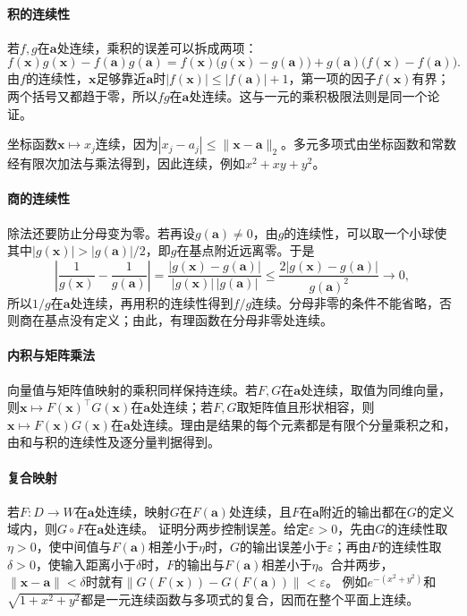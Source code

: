 \paragraph{积的连续性}
若$f,g$在$\bm a$处连续，乘积的误差可以拆成两项：
\[
 f(\bm x)g(\bm x)-f(\bm a)g(\bm a)
 =f(\bm x)\bigl(g(\bm x)-g(\bm a)\bigr)+g(\bm a)\bigl(f(\bm x)-f(\bm a)\bigr).
\]
由$f$的连续性，$\bm x$足够靠近$\bm a$时$|f(\bm x)|\leq|f(\bm a)|+1$，第一项的因子$f(\bm x)$有界；两个括号又都趋于零，所以$fg$在$\bm a$处连续。这与一元的乘积极限法则是同一个论证。

坐标函数$\bm x\mapsto x_j$连续，因为$|x_j-a_j|\leq\lVert\bm x-\bm a\rVert_2$。多元多项式由坐标函数和常数经有限次加法与乘法得到，因此连续，例如$x^2+xy+y^2$。

\paragraph{商的连续性}
除法还要防止分母变为零。若再设$g(\bm a)\neq0$，由$g$的连续性，可以取一个小球使其中$|g(\bm x)|>|g(\bm a)|/2$，即$g$在基点附近远离零。于是
\[
 \left|\frac1{g(\bm x)}-\frac1{g(\bm a)}\right|
 =\frac{|g(\bm x)-g(\bm a)|}{|g(\bm x)|\,|g(\bm a)|}
 \leq\frac{2|g(\bm x)-g(\bm a)|}{g(\bm a)^2}\longrightarrow0,
\]
所以$1/g$在$\bm a$处连续，再用积的连续性得到$f/g$连续。分母非零的条件不能省略，否则商在基点没有定义；由此，有理函数在分母非零处连续。

\paragraph{内积与矩阵乘法}
向量值与矩阵值映射的乘积同样保持连续。若$F,G$在$\bm a$处连续，取值为同维向量，则$\bm x\mapsto F(\bm x)^\top G(\bm x)$在$\bm a$处连续；若$F,G$取矩阵值且形状相容，则$\bm x\mapsto F(\bm x)G(\bm x)$在$\bm a$处连续。理由是结果的每个元素都是有限个分量乘积之和，由和与积的连续性及逐分量判据得到。

\paragraph{复合映射}
若$F:D\to W$在$\bm a$处连续，映射$G$在$F(\bm a)$处连续，且$F$在$\bm a$附近的输出都在$G$的定义域内，则$G\circ F$在$\bm a$处连续。
证明分两步控制误差。给定$\varepsilon>0$，先由$G$的连续性取$\eta>0$，使中间值与$F(\bm a)$相差小于$\eta$时，$G$的输出误差小于$\varepsilon$；再由$F$的连续性取$\delta>0$，使输入距离小于$\delta$时，$F$的输出与$F(\bm a)$相差小于$\eta$。合并两步，$\lVert\bm x-\bm a\rVert<\delta$时就有$\lVert G(F(\bm x))-G(F(\bm a))\rVert<\varepsilon$。
例如$e^{-(x^2+y^2)}$和$\sqrt{1+x^2+y^2}$都是一元连续函数与多项式的复合，因而在整个平面上连续。

